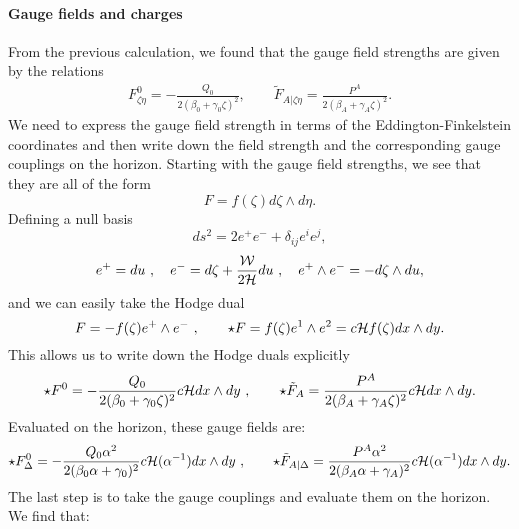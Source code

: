 \paragraph{Gauge fields and charges}
From the previous calculation, we found that the gauge field strengths are given by the relations
\begin{equation*}
    \begin{aligned}
        F^0_{\zeta \eta} = -\frac{Q_0}{2(\beta_0 + \gamma_0 \zeta)^2}, \qquad \tilde{F}_{A |\zeta \eta} = \frac{P^A}{2(\beta_A + \gamma_A \zeta)^2}.
    \end{aligned}
\end{equation*}
We need to express the gauge field strength in terms of the Eddington-Finkelstein coordinates and then write down the field strength and the corresponding gauge couplings on the horizon. Starting with the gauge field strengths, we see that they are all of the form
\begin{equation*}
    F = f(\zeta) d\zeta \wedge d\eta.
\end{equation*}
Defining a null basis
\begin{equation*}
        ds^2 = 2 e^+ e^- + \delta_{ij} e^i e^j,
\end{equation*}
\begin{equation*}
        e^+ = du \ , \quad e^- = d\zeta + \frac{{\cal W}}{2{\cal H}} du \ , \quad e^+ \wedge e^- = - d\zeta \wedge du,
\end{equation*}
and we can easily take the Hodge dual
\begin{equation*}
    F = - f(\zeta) e^+ \wedge e^- \ , \qquad \star F = f(\zeta) e^1 \wedge e^2 = c {\cal H} f(\zeta) dx \wedge dy .
\end{equation*}
This allows us to write down the Hodge duals explicitly
\begin{equation*}
    \star F^0 = - \frac{Q_0}{2(\beta_0 + \gamma_0 \zeta)^2} c{\cal H} dx\wedge dy \ , \qquad     \star \tilde{F}_A = \frac{P^A}{2(\beta_A + \gamma_A \zeta)^2} c{\cal H} dx\wedge dy.
\end{equation*}
Evaluated on the horizon, these gauge fields are:
\begin{equation*}
        \star F^0_\Delta = - \frac{Q_0 \alpha^2}{2(\beta_0 \alpha + \gamma_0)^2} c{\cal H}(\alpha^{-1}) dx\wedge dy \ , \qquad     \star \tilde{F}_{A|\Delta} = \frac{P^A \alpha^2}{2(\beta_A \alpha + \gamma_A)^2} c{\cal H}(\alpha^{-1}) dx\wedge dy.
\end{equation*}
The last step is to take the gauge couplings  and evaluate them on the horizon. We find that:
